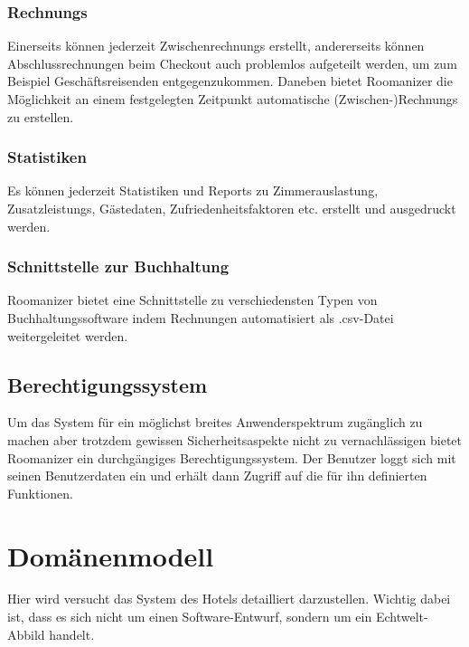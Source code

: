 \documentclass[10pt,a4paper,titlepage]{article}
\begin{document}
\subsubsection{\Glspl{Rechnung}}
Einerseits können jederzeit \Glspl{Zwischenrechnung} erstellt, andererseits können Abschlussrechnungen beim \Gls{Checkout} auch problemlos aufgeteilt werden, um zum Beispiel Geschäftsreisenden entgegenzukommen. Daneben bietet Roomanizer die Möglichkeit an einem festgelegten Zeitpunkt automatische (Zwischen-)\Glspl{Rechnung} zu erstellen. 

\subsubsection{Statistiken}
Es können jederzeit Statistiken und \Glspl{Report} zu Zimmerauslastung, \Glspl{Zusatzleistung}, Gästedaten, Zufriedenheitsfaktoren etc. erstellt und ausgedruckt werden.

\subsubsection{Schnittstelle zur Buchhaltung}
Roomanizer bietet eine Schnittstelle zu verschiedensten Typen von Buchhaltungssoftware indem Rechnungen automatisiert als .csv-Datei weitergeleitet werden.

\subsection{Berechtigungssystem}
Um das System für ein möglichst breites Anwenderspektrum zugänglich zu machen aber trotzdem gewissen Sicherheitsaspekte nicht zu vernachlässigen bietet Roomanizer ein durchgängiges Berechtigungssystem. Der Benutzer loggt sich mit seinen Benutzerdaten ein und erhält dann Zugriff auf die für ihn definierten Funktionen.

\newpage

\section{Domänenmodell}
Hier wird versucht das System des Hotels detailliert darzustellen. Wichtig dabei ist, dass es sich nicht um einen Software-Entwurf, sondern um ein Echtwelt-Abbild handelt.
\end{document}
